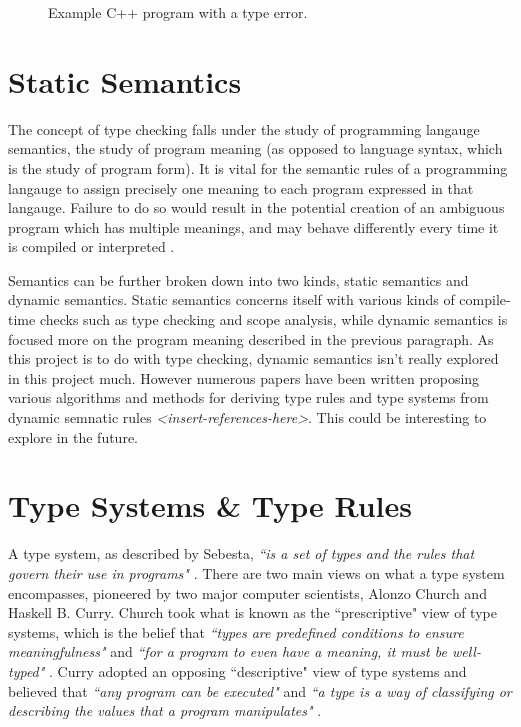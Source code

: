 \documentclass{UoYCSproject}
\begin{document}
\begin{figure}
\lstset{language=C++,
    basicstyle=\footnotesize\ttfamily,
    numbers=left,
    frame=single
    }

\caption{Example C++ program with a type error.}
\label{fig:C++TypeError}
\end{figure}

\section{Static Semantics}
The concept of type checking falls under the study of programming langauge
semantics, the study of program meaning (as opposed to language syntax, which is
the study of program form). It is vital for the semantic rules of a programming
langauge to assign precisely one meaning to each program expressed in that
langauge. Failure to do so would result in the potential creation of an
ambiguous program which has multiple meanings, and may behave differently every
time it is compiled or interpreted \cite[p.~114]{Sebesta}.

Semantics can be further broken down into two kinds, static semantics and
dynamic semantics. Static semantics concerns itself with various kinds
of compile-time checks such as type checking and scope analysis, while dynamic
semantics is focused more on the program meaning described in the previous
paragraph. As this project is to do with type checking, dynamic semantics isn't
really explored in this project much. However numerous papers have been written
proposing various algorithms and methods for deriving type rules and type
systems from dynamic semnatic rules \textit{<insert-references-here>}. This could
be interesting to explore in the future.

\section{Type Systems \& Type Rules}

A type system, as described by Sebesta, \textit{``is a set of types and the rules that
    govern their use in programs"} \cite[6, p.~309]{Sebesta}.
There are two main views on what a type system encompasses, pioneered by two
major computer scientists, Alonzo Church and Haskell B. Curry.
Church took what is known as the ``prescriptive" view of type systems, which is
the belief that \textit{``types are predefined conditions to ensure meaningfulness"}
and \textit{``for a program to even have a meaning, it must be well-typed"}
\cite{NeilJones}. Curry adopted an opposing ``descriptive" view of type systems
and believed that \textit{``any program can be executed"} and \textit{``a type
    is a way of classifying or describing the values that a program manipulates"}
\cite{NeilJones}.
\end{document}
